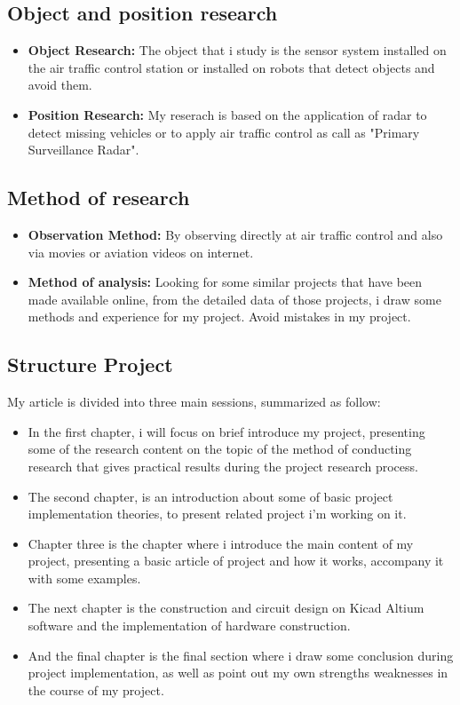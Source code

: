 \documentclass[a4paper]{report}
\begin{document}
    \subsection{Object and position research}
    \vspace{3mm}
        \begin{itemize}
            \item \textbf{Object Research:} The object that i study is the sensor system 
        installed on the air traffic control station or installed on robots that detect 
        objects and avoid them.
            \item \textbf{Position Research:} My reserach is based on the application of radar 
        to detect missing vehicles or to apply air traffic control as call as "Primary Surveillance Radar".
        \end{itemize} 
    \subsection{Method of research}
        \begin{itemize}
            \item \textbf{Observation Method:} By observing directly at air traffic control 
        and also via movies or aviation videos on internet.
            \item \textbf{Method of analysis:} Looking for some similar projects that have 
        been made available online, from the detailed data of those projects, i draw some 
        methods and experience for my project. Avoid mistakes in my project.
        \end{itemize}
    \subsection{Structure Project}
        My article is divided into three main sessions, summarized as follow: 
        \begin{itemize}
            \item In the first chapter, i will focus on brief introduce my project, presenting 
        some of the research content on the topic of the method of conducting research that 
        gives practical results during the project research process.
            \item The second chapter, is an introduction about some of basic project implementation 
        theories, to present related project i'm working on it.
            \item Chapter three is the chapter where i introduce the main content of my project, 
        presenting a basic article of project and how it works, accompany it with some examples.
            \item The next chapter is the construction and circuit design on Kicad Altium software 
        and the implementation of hardware construction.
            \item And the final chapter is the final section where i draw some conclusion during 
        project implementation, as well as point out my own strengths weaknesses in the course of my project.
        \end{itemize}
    \newpage
\end{document}
